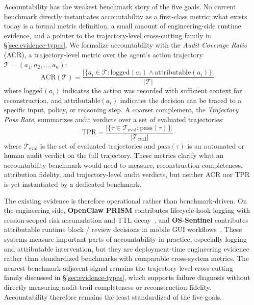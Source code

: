 Accountability has the weakest benchmark story of the five goals. No current benchmark directly instantiates accountability as a first-class metric; what exists today is a formal metric definition, a small amount of engineering-side runtime evidence, and a pointer to the trajectory-level cross-cutting family in §\ref{sec:evidence-types}. We formalize accountability with the \emph{Audit Coverage Ratio} (ACR), a trajectory-level metric over the agent's action trajectory $\mathcal{T} = (a_1, a_2, \ldots, a_n)$:
\begin{equation}
\mathrm{ACR}(\mathcal{T}) = \frac{|\{a_i \in \mathcal{T} : \mathrm{logged}(a_i) \wedge \mathrm{attributable}(a_i)\}|}{|\mathcal{T}|}
\label{eq:acr}
\end{equation}
where $\mathrm{logged}(a_i)$ indicates the action was recorded with sufficient context for reconstruction, and $\mathrm{attributable}(a_i)$ indicates the decision can be traced to a specific input, policy, or reasoning step. A coarser complement, the \emph{Trajectory Pass Rate}, summarizes audit verdicts over a set of evaluated trajectories:
\begin{equation}
\mathrm{TPR} = \frac{|\{\tau \in \mathcal{T}_{\mathrm{eval}} : \mathrm{pass}(\tau)\}|}{|\mathcal{T}_{\mathrm{eval}}|}
\label{eq:tpr}
\end{equation}
where $\mathcal{T}_{\mathrm{eval}}$ is the set of evaluated trajectories and $\mathrm{pass}(\tau)$ is an automated or human audit verdict on the full trajectory. These metrics clarify what an accountability benchmark would need to measure, reconstruction completeness, attribution fidelity, and trajectory-level audit verdicts, but neither ACR nor TPR is yet instantiated by a dedicated benchmark.

The existing evidence is therefore operational rather than benchmark-driven. On the engineering side, \textbf{OpenClaw PRISM} contributes lifecycle-hook logging with session-scoped risk accumulation and TTL decay~\cite{openclawprism2026}, and \textbf{OS-Sentinel} contributes attributable runtime block / review decisions in mobile GUI workflows~\cite{ossentinel2025}. These systems measure important parts of accountability in practice, especially logging and attributable intervention, but they are deployment-time engineering evidence rather than standardized benchmarks with comparable cross-system metrics. The nearest benchmark-adjacent signal remains the trajectory-level cross-cutting family discussed in §\ref{sec:evidence-types}, which supports failure diagnosis without directly measuring audit-trail completeness or reconstruction fidelity. Accountability therefore remains the least standardized of the five goals.

